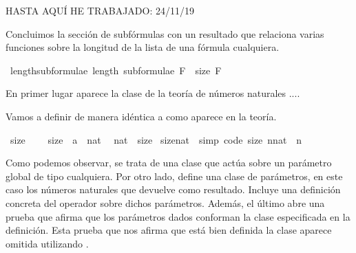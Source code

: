 \begin{isabellebody}
%
\begin{isamarkuptext}%
HASTA AQUÍ HE TRABAJADO: 24/11/19%
\end{isamarkuptext}\isamarkuptrue%
%
\begin{isamarkuptext}%
Concluimos la sección de subfórmulas con un resultado que 
  relaciona varias funciones sobre la longitud de la lista 
   de una fórmula  cualquiera.%
\end{isamarkuptext}\isamarkuptrue%
\isamarkupfalse%
\ length{\isacharunderscore}subformulae{\isacharcolon}\ {\isachardoublequoteopen}length\ {\isacharparenleft}subformulae\ F{\isacharparenright}\ {\isacharequal}\ size\ F{\isachardoublequoteclose}\ \isanewline
%
\isadelimproof
\ \ %
\endisadelimproof
%
\isatagproof
{}\isamarkupfalse%
%
\endisatagproof
{\isafoldproof}%
%
\isadelimproof
%
\endisadelimproof
%
\begin{isamarkuptext}%
En primer lugar aparece la clase  de la teoría de 
  números naturales ....

  Vamos a definir  de manera idéntica a como aparece 
   en la teoría.%
\end{isamarkuptext}\isamarkuptrue%
\isamarkupfalse%
\ size{}\ {\isacharequal}\isanewline
\ \ \ size{}\ {\isacharcolon}{\isacharcolon}\ {\isachardoublequoteopen}{\isacharprime}a\ {\isasymRightarrow}\ nat{\isachardoublequoteclose}\ \isanewline
\isanewline
{}\isamarkupfalse%
\ nat\ {\isacharcolon}{\isacharcolon}\ size{}\isanewline
{}\isanewline
\isanewline
{}\isamarkupfalse%
\ size{}{\isacharunderscore}nat\ \ {\isacharbrackleft}simp{\isacharcomma}\ code{\isacharbrackright}{\isacharcolon}\ {\isachardoublequoteopen}size{}\ {\isacharparenleft}n{\isacharcolon}{\isacharcolon}nat{\isacharparenright}\ {\isacharequal}\ n{\isachardoublequoteclose}\isanewline
\isanewline
{}\isamarkupfalse%
%
\isadelimproof
\ %
\endisadelimproof
%
\isatagproof
\isacommand{{\isachardot}{\isachardot}}\isamarkupfalse%
%
\endisatagproof
{\isafoldproof}%
%
\isadelimproof
%
\endisadelimproof
\isanewline
\isanewline
{}\isamarkupfalse%
%
\begin{isamarkuptext}%
Como podemos observar, se trata de una clase que actúa sobre un 
  parámetro global de tipo  cualquiera. Por otro lado, 
   define una clase de parámetros, en este caso los 
  números naturales  que devuelve como resultado. Incluye una 
  definición concreta del operador  sobre dichos parámetros. 
  Además, el último  abre una prueba que afirma que los 
  parámetros dados conforman la clase especificada en la definición. 
  Esta prueba que nos afirma que está bien definida la clase aparece
  omitida utilizando \isa{{\isachardot}{\isachardot}} .


\end{isamarkuptext}
\end{isabellebody}
